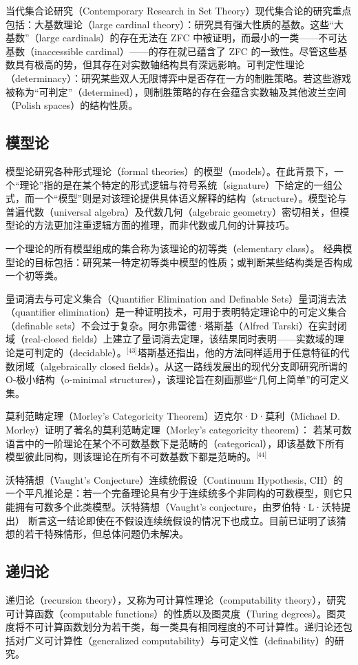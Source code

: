 当代集合论研究（Contemporary Research in Set Theory）现代集合论的研究重点包括：大基数理论（large cardinal theory）：研究具有强大性质的基数。这些“大基数”（large cardinals）的存在无法在 ZFC 中被证明，而最小的一类——不可达基数（inaccessible cardinal）——的存在就已蕴含了 ZFC 的一致性。尽管这些基数具有极高的势，但其存在对实数轴结构具有深远影响。可判定性理论（determinacy）：研究某些双人无限博弈中是否存在一方的制胜策略。若这些游戏被称为“可判定”（determined），则制胜策略的存在会蕴含实数轴及其他波兰空间（Polish spaces）的结构性质。
\subsection{模型论}
模型论研究各种形式理论（formal theories）的模型（models）。在此背景下，一个“理论”指的是在某个特定的形式逻辑与符号系统（signature）下给定的一组公式，而一个“模型”则是对该理论提供具体语义解释的结构（structure）。模型论与普遍代数（universal algebra）及代数几何（algebraic geometry）密切相关，但模型论的方法更加注重逻辑方面的推理，而非代数或几何的计算技巧。

一个理论的所有模型组成的集合称为该理论的初等类（elementary class）。  
经典模型论的目标包括：研究某一特定初等类中模型的性质；或判断某些结构类是否构成一个初等类。

量词消去与可定义集合（Quantifier Elimination and Definable Sets）量词消去法（quantifier elimination）是一种证明技术，可用于表明特定理论中的可定义集合（definable sets）不会过于复杂。阿尔弗雷德·塔斯基（Alfred Tarski）在实封闭域（real-closed fields）上建立了量词消去定理，该结果同时表明——实数域的理论是可判定的（decidable）。\(^\text{[43]}\)塔斯基还指出，他的方法同样适用于任意特征的代数闭域（algebraically closed fields）。从这一路线发展出的现代分支即研究所谓的O-极小结构（o-minimal structures），该理论旨在刻画那些“几何上简单”的可定义集。

莫利范畴定理（Morley’s Categoricity Theorem）迈克尔·D·莫利（Michael D. Morley）证明了著名的莫利范畴定理（Morley’s categoricity theorem）： 若某可数语言中的一阶理论在某个不可数基数下是范畴的（categorical），即该基数下所有模型彼此同构，则该理论在所有不可数基数下都是范畴的。\(^\text{[44]}\)

沃特猜想（Vaught’s Conjecture）连续统假设（Continuum Hypothesis, CH）的一个平凡推论是：若一个完备理论具有少于连续统多个非同构的可数模型，则它只能拥有可数多个此类模型。沃特猜想（Vaught’s conjecture，由罗伯特·L·沃特提出）  断言这一结论即使在不假设连续统假设的情况下也成立。目前已证明了该猜想的若干特殊情形，但总体问题仍未解决。
\subsection{递归论}
递归论（recursion theory），又称为可计算性理论（computability theory），研究可计算函数（computable functions）的性质以及图灵度（Turing degrees）。图灵度将不可计算函数划分为若干类，每一类具有相同程度的不可计算性。递归论还包括对广义可计算性（generalized computability）与可定义性（definability）的研究。  

